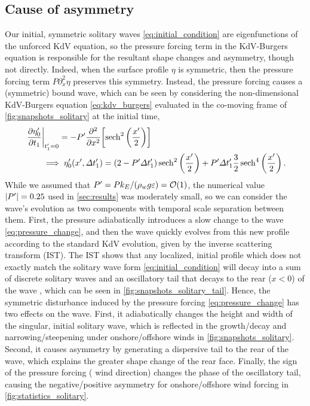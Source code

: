 \documentclass{jfm}
\renewcommand*{\epsilon}{\varepsilon}
\begin{document}
\subsection{\label{sec:physical_reason} Cause of asymmetry}
Our initial, symmetric solitary waves \cref{eq:initial_condition} are
eigenfunctions of the unforced KdV equation, so the pressure forcing
term in the KdV-Burgers equation is responsible for the resultant shape
changes and asymmetry, though not directly.
Indeed, when the surface profile $\eta$ is symmetric, then the pressure
forcing term $P \partial_x^2 \eta$ preserves this symmetry.
Instead, the pressure forcing causes a (symmetric) bound wave, which can
be seen by considering the non-dimensional KdV-Burgers equation
\cref{eq:kdv_burgers} evaluated in the co-moving frame of
\cref{fig:snapshots_solitary} at the initial time,
\begin{equation}
  \begin{split}
  &\eval{\pdv{\eta'_0}{t_1}}_{t'_1=0} = -P' \pdv[2]{x} \bqty{
  \sech^2\pqty{\frac{x'}{2}}}
  \\
  &\qquad \implies \eta'_0(x', \Delta t'_1) =
  (2-P'\Delta t'_1) \sech^2\pqty{\frac{x'}{2}}
  +
  P' \Delta t'_1 \frac{3}{2}\sech^4\pqty{\frac{x'}{2}}
  \,.
  \end{split}
  \label{eq:pressure_change}
\end{equation}
While we assumed that $P' = Pk_E/(\rho_w g \epsilon) = \order{1}$, the
numerical value $\abs{P'} = 0.25$ used in \cref{sec:results} was
moderately small, so we can consider the wave's evolution as two
components with temporal scale separation between them.
First, the pressure adiabatically introduces a slow change to the wave
\cref{eq:pressure_change}, and then the wave quickly evolves from this
new profile according to the standard KdV evolution, given by the
inverse scattering transform (IST).
The IST shows that any localized, initial profile which does not exactly
match the solitary wave form \cref{eq:initial_condition} will decay into
a sum of discrete solitary waves and an oscillatory tail that decays to
the rear ($x<0$) of the wave \citep[\eg][]{mei2005nonlinear}, which can
be seen in \cref{fig:snapshots_solitary_tail}.
Hence, the symmetric disturbance induced by the pressure forcing
\cref{eq:pressure_change} has two effects on the wave.
First, it adiabatically changes the height and width of the singular,
initial solitary wave, which is reflected in the growth/decay and
narrowing/steepening under onshore/offshore winds in
\cref{fig:snapshots_solitary}.
Second, it causes asymmetry by generating a dispersive tail to the rear
of the wave, which explains the greater shape change of the rear face.
Finally, the sign of the pressure forcing (\ie{} wind direction) changes
the phase of the oscillatory tail, causing the negative/positive
asymmetry for onshore/offshore wind forcing in
\cref{fig:statistics_solitary}.
\end{document}
